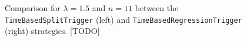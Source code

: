 \begin{figure}[htpb]
\begin{subfigure}{0.5\textwidth}
	\end{subfigure}
	\caption{Comparison for $\lambda=1.5$ and $n=11$ between the \texttt{TimeBasedSplitTrigger} (left) and \texttt{TimeBasedRegressionTrigger} (right) strategies. [TODO]}
	\label{fig:split_vs_regression}
\end{figure}



